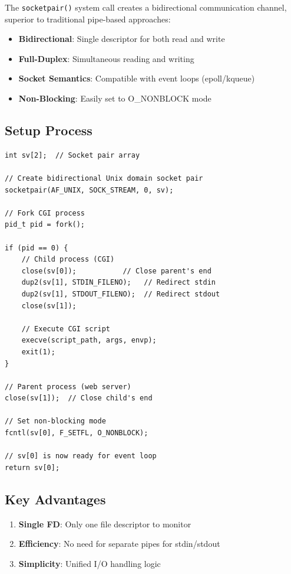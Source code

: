 \documentclass[12pt,a4paper]{article}
\begin{document}
The \texttt{socketpair()} system call creates a bidirectional communication channel, superior to traditional pipe-based approaches:

\begin{itemize}
    \item \textbf{Bidirectional}: Single descriptor for both read and write
    \item \textbf{Full-Duplex}: Simultaneous reading and writing
    \item \textbf{Socket Semantics}: Compatible with event loops (epoll/kqueue)
    \item \textbf{Non-Blocking}: Easily set to O\_NONBLOCK mode
\end{itemize}

\subsection{Setup Process}

\begin{lstlisting}[caption=Socketpair Creation]
int sv[2];  // Socket pair array

// Create bidirectional Unix domain socket pair
socketpair(AF_UNIX, SOCK_STREAM, 0, sv);

// Fork CGI process
pid_t pid = fork();

if (pid == 0) {
    // Child process (CGI)
    close(sv[0]);           // Close parent's end
    dup2(sv[1], STDIN_FILENO);   // Redirect stdin
    dup2(sv[1], STDOUT_FILENO);  // Redirect stdout
    close(sv[1]);
    
    // Execute CGI script
    execve(script_path, args, envp);
    exit(1);
}

// Parent process (web server)
close(sv[1]);  // Close child's end

// Set non-blocking mode
fcntl(sv[0], F_SETFL, O_NONBLOCK);

// sv[0] is now ready for event loop
return sv[0];
\end{lstlisting}

\subsection{Key Advantages}

\begin{enumerate}
    \item \textbf{Single FD}: Only one file descriptor to monitor
    \item \textbf{Efficiency}: No need for separate pipes for stdin/stdout
    \item \textbf{Simplicity}: Unified I/O handling logic
\end{enumerate}
\end{document}
